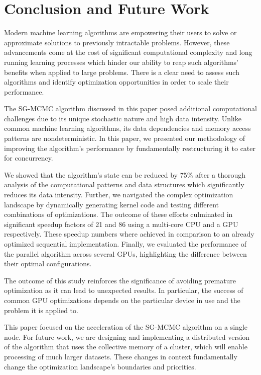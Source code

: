 \section{Conclusion and Future Work}
Modern machine learning algorithms are empowering their
users to solve or approximate solutions to previously intractable problems.
However, these advancements come at the cost of significant computational
complexity and long running learning processes which hinder our ability to reap
such algorithms' benefits when applied to large problems. There is a clear need
to assess such algorithms and identify optimization opportunities in order to
scale their performance.

The SG-MCMC algorithm discussed in this paper posed additional computational
challenges due to its unique stochastic nature and high data intensity. Unlike
common machine learning algorithms, its data dependencies and memory access
patterns are nondeterministic. In this paper, we presented our methodology of
improving the algorithm's performance by fundamentally restructuring it to
cater for concurrency.

We showed that the algorithm's state can be reduced by 75\% after a thorough
analysis of the computational patterns and data structures which significantly
reduces its data intensity. Further, we navigated the complex optimization
landscape by dynamically generating kernel code and testing different
combinations of optimizations. The outcome of these efforts culminated in
significant speedup factors of 21 and 86 using a multi-core CPU and a GPU
respectively. These speedup numbers where achieved in comparison to an already
optimized sequential implementation. Finally, we evaluated the performance of
the parallel algorithm across several GPUs, highlighting the difference between
their optimal configurations.

The outcome of this study reinforces the significance of avoiding premature
optimization as it can lead to unexpected results. In particular, the success
of common GPU optimizations depends on the particular device in use and the
problem it is applied to.

This paper focused on the acceleration of the SG-MCMC algorithm on a
single node. For future work, we are designing and implementing a distributed
version of the algorithm that uses the collective memory of a cluster, which will enable
processing of much larger datasets. These changes in context fundamentally
change the optimization landscape's boundaries and priorities.
